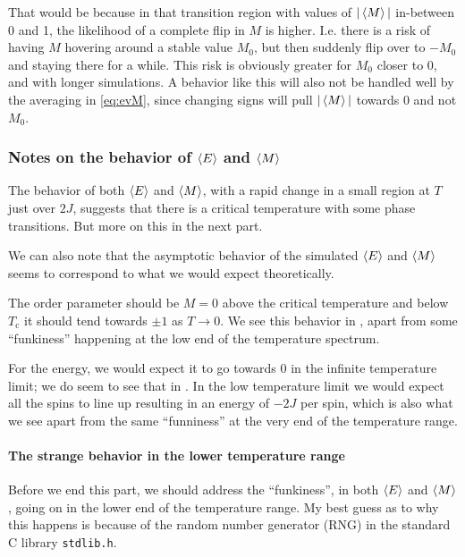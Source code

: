 \documentclass[11pt,letter, swedish, english
]{article}
\newcommand{\Tc}{\ensuremath{T_{\text{c}}}}
\begin{document}
That would be because in that transition region with values of
$|\ev{M}|$ in-between 0 and 1, the likelihood of a complete flip in $M$
is higher. I.e. there is a risk of having $M$ hovering around a stable
value $M_0$, but then suddenly flip over to $-M_0$ and staying there
for a while. This risk is obviously greater for $M_0$ closer to $0$,
and with longer simulations. 
A behavior like this will also not be handled well by the averaging
in \eqref{eq:evM}, since changing signs will pull $|\ev{M}|$ towards 0
and not $M_0$. 


\subsubsection{Notes on the behavior of $\ev{E}$ and $\ev{M}$}
The behavior of both $\ev{E}$ and $\ev{M}$, with a rapid change in a
small region at $T$ just over $2J$, suggests that there is a critical
temperature with some phase transitions. But more on this in the next
part. 

We can also note that the asymptotic behavior of the simulated
$\ev{E}$ and $\ev{M}$ seems to correspond to what we would expect
theoretically. 

The order parameter should be $M=0$ above the critical
temperature and below $\Tc$ it should tend towards $\pm1$ as
$T\to0$. We see this behavior in , apart from some
``funkiness'' happening at the low end of the temperature spectrum. 

For the energy, we would expect it to go towards 0 in the infinite
temperature limit; we do seem to see that in . In the
low temperature limit we would expect all the spins to line up
resulting in an energy of $-2J$ per spin\footnotemark{}, which is also
what we see apart from the same ``funniness'' at the very end of the
temperature range. 

\paragraph{The strange behavior in the lower temperature range}
Before we end this part, we should address the ``funkiness'', in both
$\ev{E}$ and $\ev{M}$, going on in the lower end of the temperature
range. My best guess as to why this happens is because of the random
number generator (RNG) in the standard C library \texttt{stdlib.h}.
\end{document}
